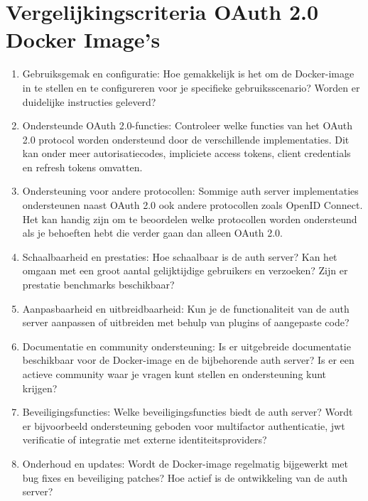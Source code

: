 \section{Vergelijkingscriteria OAuth 2.0 Docker Image's}%
\label{sec:vergelijkingscriteria-oauth2-docker-image}

\begin{enumerate}
  \item Gebruiksgemak en configuratie: Hoe gemakkelijk is het om de Docker-image in te stellen en te configureren voor je specifieke gebruiksscenario? Worden er duidelijke instructies geleverd?

  \item Ondersteunde OAuth 2.0-functies: Controleer welke functies van het OAuth 2.0 protocol worden ondersteund door de verschillende implementaties. Dit kan onder meer autorisatiecodes, impliciete access tokens, client credentials en refresh tokens omvatten.
  
  \item Ondersteuning voor andere protocollen: Sommige \gls{auth} server implementaties ondersteunen naast OAuth 2.0 ook andere protocollen zoals OpenID Connect. Het kan handig zijn om te beoordelen welke protocollen worden ondersteund als je behoeften hebt die verder gaan dan alleen OAuth 2.0.
  
  \item Schaalbaarheid en prestaties: Hoe schaalbaar is de \gls{auth} server? Kan het omgaan met een groot aantal gelijktijdige gebruikers en verzoeken? Zijn er prestatie benchmarks beschikbaar?
  
  \item Aanpasbaarheid en uitbreidbaarheid: Kun je de functionaliteit van de \gls{auth} server aanpassen of uitbreiden met behulp van plugins of aangepaste code?
  
  \item Documentatie en community ondersteuning: Is er uitgebreide documentatie beschikbaar voor de Docker-image en de bijbehorende \gls{auth} server? Is er een actieve community waar je vragen kunt stellen en ondersteuning kunt krijgen?
  
  \item Beveiligingsfuncties: Welke beveiligingsfuncties biedt de \gls{auth} server? Wordt er bijvoorbeeld ondersteuning geboden voor multifactor authenticatie, \gls{jwt} verificatie of integratie met externe identiteitsproviders?
  
  \item Onderhoud en updates: Wordt de Docker-image regelmatig bijgewerkt met bug fixes en beveiliging patches? Hoe actief is de ontwikkeling van de \gls{auth} server?
  

\end{enumerate}
